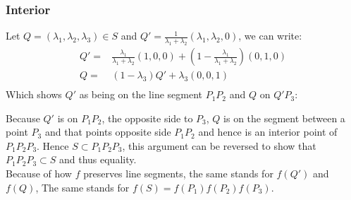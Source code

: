 \subsubsection{Interior}
Let $Q = (\lambda_1,\lambda_2,\lambda_3)\in S$ and $Q' = \frac{1}{\lambda_1+\lambda_2}(\lambda_1,\lambda_2,0)$, we can write:
\begin{equation*}
\begin{aligned}
	Q'=&\frac{\lambda_1}{\lambda_1+\lambda_2}(1,0,0)+\left(1-\frac{\lambda_1}{\lambda_1+\lambda_2}\right)(0,1,0)\\
	Q =& (1-\lambda_3)Q'+\lambda_3(0,0,1)\\
\end{aligned}
\end{equation*}
Which shows $Q'$ as being on the line segment $P_1P_2$ and $Q$ on $Q'P_3$:
\begin{center}
\end{center}
Because $Q'$ is on $P_1P_2$,
the opposite side to $P_3$,
$Q$ is on the segment between a point $P_3$ and that points opposite side $P_1P_2$ and hence is an interior point of $P_1P_2P_3$.
Hence $S\subset P_1P_2P_3$, 
this argument can be reversed to show that $P_1P_2P_3 \subset S$ and thus equality.
\\

Because of how $f$ preserves line segments,
the same stands for $f(Q')$ and $f(Q)$,
The same stands for $f(S) = f(P_1)f(P_2)f(P_3)$.

